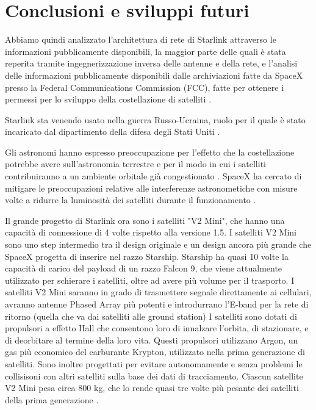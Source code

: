 
\chapter{Conclusioni e sviluppi futuri}
\label{chp:conclusions}

Abbiamo quindi analizzato l'architettura di rete di Starlink attraverso le informazioni pubblicamente disponibili, la maggior parte delle quali è stata reperita tramite ingegnerizzazione inversa delle antenne e della rete, e l'analisi delle informazioni pubblicamente disponibili dalle archiviazioni fatte da SpaceX presso la Federal Communications Commission (FCC), fatte per ottenere i permessi per lo sviluppo della costellazione di satelliti \cite{jonathan_mcdowell_section_nodate}.

Starlink sta venendo usato nella guerra Russo-Ucraina, ruolo per il quale è stato incaricato dal dipartimento della difesa degli Stati Uniti \cite{amanda_macias_pentagon_2023}.

Gli astronomi hanno espresso preoccupazione per l'effetto che la costellazione potrebbe avere sull'astronomia terrestre e per il modo in cui i satelliti contribuiranno a un ambiente orbitale già congestionato \cite{nadia_drake_will_2019}.
SpaceX ha cercato di mitigare le preoccupazioni relative alle interferenze astronometiche con misure volte a ridurre la luminosità dei satelliti durante il funzionamento \cite{starlink_brightness_nodate}.

Il grande progetto di Starlink ora sono i satelliti "V2 Mini", che hanno una capacità di connessione di 4 volte rispetto alla versione 1.5.
I satelliti V2 Mini sono uno step intermedio tra il design originale e un design ancora più grande che SpaceX progetta di inserire nel razzo Starship.
Starship ha quasi 10 volte la capacità di carico del payload di un razzo Falcon 9, che viene attualmente utilizzato per schierare i satelliti,  oltre ad avere più volume per il trasporto.
I satelliti V2 Mini saranno in grado di trasmettere segnale direttamente ai cellulari, avranno antenne Phased Array più potenti e introdurrano l'E-band per la rete di ritorno (quella che va dai satelliti alle ground station)
I satelliti sono dotati di propulsori a effetto Hall che consentono loro di innalzare l'orbita, di stazionare, e di deorbitare al termine della loro vita.
Questi propulsori utilizzano Argon, un gas più economico del carburante Krypton, utilizzato nella prima generazione di satelliti.
Sono inoltre progettati per evitare autonomamente e senza problemi le collisisoni con altri satelliti sulla base dei dati di tracciamento.
Ciascun satellite V2 Mini pesa circa 800 kg, che lo rende quasi tre volte più pesante dei satelliti della prima generazione \cite{starlink_secon_nodate}.

